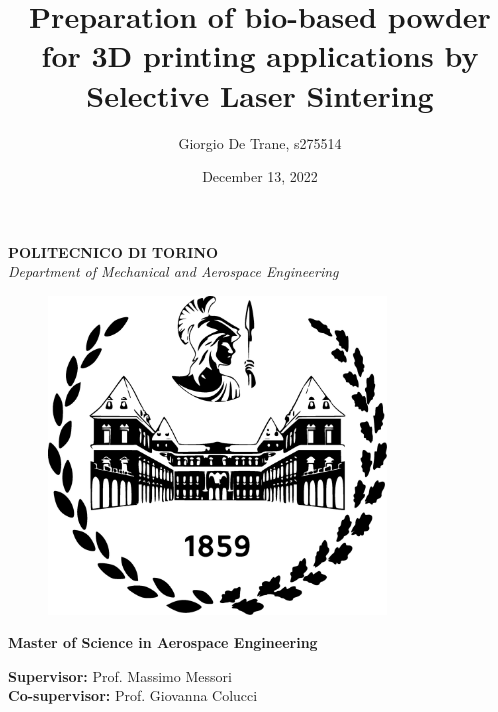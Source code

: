 \documentclass[a4paper]{article}
\author{Giorgio De Trane, s275514}
\title{\textbf{Preparation of bio-based powder for 3D printing applications by Selective Laser Sintering}}
\date{December 13, 2022}
\begin{document}
    \setlength{\parindent}{0pt}

    \begin{titlepage}
        \pagestyle{empty}

    \maketitle
    \maketitle
    \begin{center}
        \textbf{POLITECNICO DI TORINO} \\ 
        \textit{Department of Mechanical and Aerospace Engineering} \\
    \end{center}

    \begin{figure}[ht]
        \centering
        \includegraphics[width=0.8\textwidth]{Pictures/polito_logo.eps}  
        \label{fig:polito_logo}      
    \end{figure}

    \begin{center} 
        \textbf{Master of Science in Aerospace Engineering} \\
    \end{center}


    \begin{center}
        \textbf{Supervisor:} Prof. Massimo Messori \\
        \textbf{Co-supervisor:} Prof. Giovanna Colucci \\
    \end{center}

\end{titlepage}
\end{document}
